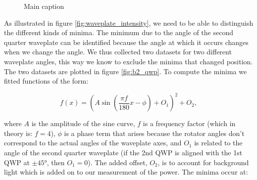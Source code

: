 \documentclass[12pt,twoside]{article}
\begin{document}
\begin{figure}[h]
    \centering
    \hspace{-17pt}
    \caption{Main caption}
    \label{fig:waveplate_analysis}
\end{figure}

As illustrated in figure \ref{fig:waveplate_intensity}, we need to be able to distinguish the different kinds of minima. The minimum due to the angle of the second quarter waveplate can be identified because the angle at which it occurs changes when we change the angle. We thus collected two datasets for two different waveplate angles, this way we know to exclude the minima that changed position. The two datasets are plotted in figure \ref{fig:b2_qwp}. To compute the minima we fitted functions of the form:

\begin{equation}
f(x)=\left( A\sin{\left(\frac{\pi f}{180}x- \phi \right)} + O_1 \right)^2 +O_2,
\end{equation}

where $A$ is the amplitude of the sine curve, $f$ is a frequency factor (which in theory is: $f=4$), $\phi$ is a phase term that arises because the rotator angles don't correspond to the actual angles of the waveplate axes, and $O_1$ is related to the angle of the second quarter waveplate (if the 2nd QWP is aligned with the 1st QWP at $\pm45°$, then $O_1 =0$). The added offset, $O_2$, is to account for background light which is added on to our measurement of the power. The minima occur at:
\end{document}
